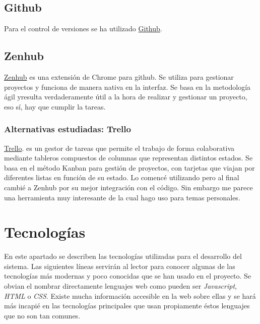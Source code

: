    \subsection{Github}\label{github}
   Para el control de versiones se ha utilizado \hyperlink{https://www.github.com/}{Github}. 
   
    \subsection{Zenhub}\label{zenhub}
    \hyperlink{https://www.zenhub.io/}{Zenhub} es una extensión de Chrome para github. Se utiliza para gestionar proyectos y funciona de manera nativa en la interfaz. Se basa en la metodología ágil yresulta verdaderamente útil a la hora de realizar y gestionar un proyecto, eso sí, hay que cumplir la tareas. 
    
     \subsubsection{Alternativas estudiadas: Trello}\label{trello}
      \hyperlink{https://www.trello.com/}{Trello}.  es un gestor de tareas que permite el trabajo de forma colaborativa mediante tableros compuestos de columnas  que representan distintos estados. Se basa en el método Kanban para gestión de proyectos, con tarjetas que viajan por diferentes listas en función de su estado. Lo comencé utilizando pero al final cambié a Zenhub por su mejor integración con el código. Sin embargo me parece una herramienta muy interesante de la cual hago uso para temas personales. 
     
     

\section{Tecnologías}\label{tecnologias}
 En este apartado se describen las tecnologías utilizadas para el desarrollo del sistema. Las siguientes líneas servirán al lector para conocer algunas de las tecnologías más modernas y poco conocidas que se han usado en el proyecto. Se obvian el nombrar directamente lenguajes web como pueden ser \emph{Javascript}, \emph{HTML} o \emph{CSS}. Existe mucha información accesible en la web sobre ellas y se hará más incapié en las tecnologías principales que usan propiamente éstos lenguajes que no son tan comunes.
 
